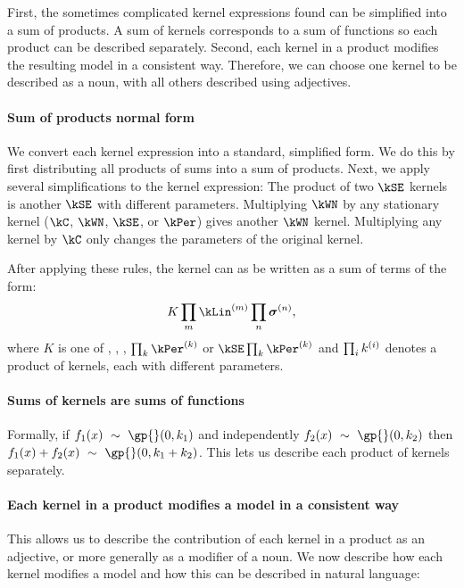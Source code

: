 First, the sometimes complicated kernel expressions found can be simplified into a sum of products.
A sum of kernels corresponds to a sum of functions so each product can be described separately.
Second, each kernel in a product modifies the resulting model in a consistent way.
Therefore, we can choose one kernel to be described as a noun, with all others described using adjectives.

\paragraph{Sum of products normal form} 

We convert each kernel expression into a standard, simplified form.
We do this by first distributing all products of sums into a sum of products.
Next, we apply several simplifications to the kernel expression:
The product of two $\kSE$ kernels is another $\kSE$ with different parameters. Multiplying $\kWN$ by any stationary kernel ($\kC$, $\kWN$, $\kSE$, or $\kPer$) gives another $\kWN$ kernel. Multiplying any kernel by $\kC$ only changes the parameters of the original kernel.

After applying these rules, the kernel can as be written as a sum of terms of the form:
\begin{align}
K \prod_m \kLin^{(m)} \prod_n \boldsymbol\sigma^{(n)},
\label{eq:sop}
\end{align}
where $K$ is one of \kWN, \kC, \kSE, $\prod_k \kPer^{(k)}$ or $\kSE \prod_k \kPer^{(k)}$
and $\prod_ik^{(i)}$ denotes a product of kernels, each with different parameters.


\paragraph{Sums of kernels are sums of functions}
Formally, if $f_1(x) \dist \gp{}(0, \kernel_1)$ and independently $f_2(x) \dist \gp{}(0, \kernel_2)$ then ${f_1(x) + f_2(x) \dist \gp{}(0, \kernel_1 + \kernel_2)}$.
This lets us describe each product of kernels separately.


\paragraph{Each kernel in a product modifies a model in a consistent way}
This allows us to describe the contribution of each kernel in a product as an adjective, or more generally as a modifier of a noun.
We now describe how each kernel modifies a model and how this can be described in natural language:

